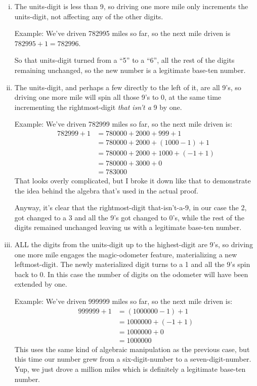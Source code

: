 \documentclass{article}
\begin{document}
\begin{enumerate}[i)]
\item The units-digit is less than 9, so driving one more mile only increments
the units-digit, not affecting any of the other digits.

Example: We've driven 782995 miles so far, so the next mile driven is
$782995 + 1 = 782996$.

So that units-digit turned from a ``5'' to a ``6'', all the rest of
the digits remaining unchanged,
so the new number is a legitimate base-ten number.
\item The units-digit, and perhaps a few directly to the left of it, are all 9's,
so driving one more mile will spin all those 9's to 0,
at the same time incrementing
the rightmost-digit \emph{that isn't a} 9 by one.

Example: We've driven 782999 miles so far, so the next mile driven is:
\begin{align*}
782999+1 &= 780000+2000+999+1\\
&=780000+2000+(1000-1)+1\\
&=780000+2000+1000+(-1+1)\\
&=780000+3000+0\\
&=783000
\end{align*}
That looks overly complicated, but I broke it down
like that to demonstrate the idea behind the algebra that's
used in the actual proof.

Anyway, it's clear that the rightmost-digit that-isn't-a-9, in our case the 2, got changed
to a 3 and all the 9's got changed to 0's, while the rest of the digits remained unchanged
leaving us with a legitimate base-ten number.
\item ALL the digits from the units-digit up to the highest-digit are 9's,
so driving one more mile
engages the magic-odometer feature, materializing a new leftmost-digit.
The newly materialized digit turns to a 1 and all the 9's spin back to 0.
In this case the number of digits on the odometer will have been extended by one.

Example: We've driven 999999 miles so far, so the next mile driven is:
\begin{align*}
999999+1 &=(1000000-1)+1\\
&=1000000+(-1+1)\\
&=1000000+0\\
&=1000000
\end{align*}
This uses the same kind of algebraic manipulation as the previous case, but this time our number grew from a
six-digit-number to a seven-digit-number. Yup, we just drove a million miles
which is definitely a legitimate base-ten number.
\end{enumerate}
\end{document}
